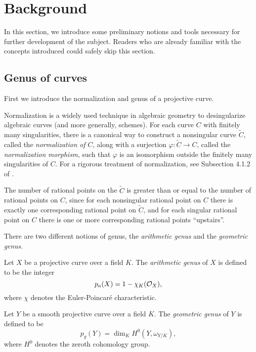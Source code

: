 \section{Background}

In this section, we introduce some preliminary notions and tools
necessary for further development of the subject. Readers who are
already familiar with the concepts introduced could safely skip this
section.

\subsection{Genus of curves}

First we introduce the normalization and genus of a projective curve.

Normalization is a widely used technique in algebraic geometry to
desingularize algebraic curves (and more generally, schemes). For each
curve $C$ with finitely many singularities, there is a canonical way
to construct a nonsingular curve $\tilde{C}$, called the
\emph{normalization of $C$}, along with a surjection $\varphi:
\tilde{C} \to C$, called the \emph{normalization morphism}, such that
$\varphi$ is an isomorphism outside the finitely many singularities of
$C$. For a rigorous treatment of normalization, see Subsection 4.1.2
of \cite{MR1917232}.

\begin{remark}
  \label{rem:ratpoint-normalization}
  The number of rational points on the $\tilde{C}$ is greater
  than or equal to the number of rational points on $C$, since for
  each nonsingular rational point on $C$ there is exactly one
  corresponding rational point on $\tilde{C}$, and for each singular
  rational point on $C$ there is one or more corresponding rational
  points ``upstairs''.
\end{remark}

There are two different notions of genus, the \emph{arithmetic genus}
and the \emph{geometric genus}.

\begin{definition}
  Let $X$ be a projective curve over a field $K$. The \emph{arithmetic
    genus} of $X$ is defined to be the integer
  \[
  p_a(X) = 1 - \chi_K(\mathcal{O}_X),
  \]
  where $\chi$ denotes the Euler-Poincar\'e characteristic.
\end{definition}

\begin{definition}
  Let $Y$ be a smooth projective curve over a field $K$. The
  \emph{geometric genus} of $Y$ is defined to be
  \[
  p_g(Y) = \dim_K H^0(Y, \omega_{Y/K}),
  \]
  where $H^0$ denotes the zeroth cohomology group.
\end{definition}

